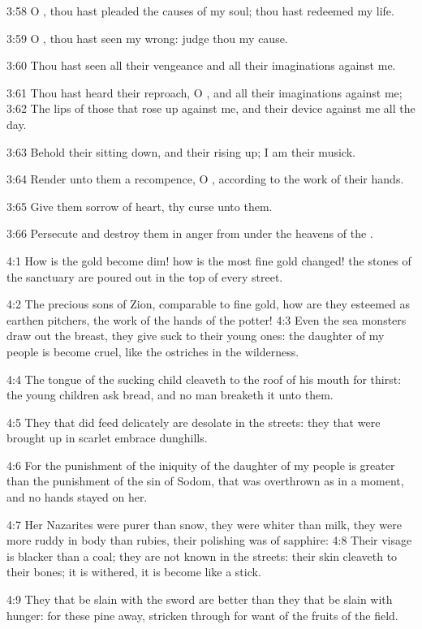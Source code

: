 3:58 O \LORD, thou hast pleaded the causes of my soul; thou hast
redeemed my life.

3:59 O \LORD, thou hast seen my wrong: judge thou my cause.

3:60 Thou hast seen all their vengeance and all their imaginations
against me.

3:61 Thou hast heard their reproach, O \LORD, and all their
imaginations against me; 3:62 The lips of those that rose up against
me, and their device against me all the day.

3:63 Behold their sitting down, and their rising up; I am their
musick.

3:64 Render unto them a recompence, O \LORD, according to the work of
their hands.

3:65 Give them sorrow of heart, thy curse unto them.

3:66 Persecute and destroy them in anger from under the heavens of the
\LORD.

4:1 How is the gold become dim! how is the most fine gold changed! the
stones of the sanctuary are poured out in the top of every street.

4:2 The precious sons of Zion, comparable to fine gold, how are they
esteemed as earthen pitchers, the work of the hands of the potter!
4:3 Even the sea monsters draw out the breast, they give suck to their
young ones: the daughter of my people is become cruel, like the
ostriches in the wilderness.

4:4 The tongue of the sucking child cleaveth to the roof of his mouth
for thirst: the young children ask bread, and no man breaketh it unto
them.

4:5 They that did feed delicately are desolate in the streets: they
that were brought up in scarlet embrace dunghills.

4:6 For the punishment of the iniquity of the daughter of my people is
greater than the punishment of the sin of Sodom, that was overthrown
as in a moment, and no hands stayed on her.

4:7 Her Nazarites were purer than snow, they were whiter than milk,
they were more ruddy in body than rubies, their polishing was of
sapphire: 4:8 Their visage is blacker than a coal; they are not known
in the streets: their skin cleaveth to their bones; it is withered, it
is become like a stick.

4:9 They that be slain with the sword are better than they that be
slain with hunger: for these pine away, stricken through for want of
the fruits of the field.

